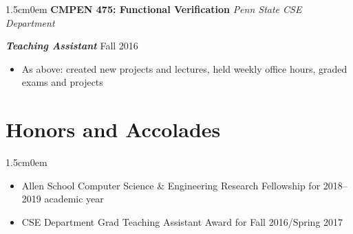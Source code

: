 \documentclass[letterpaper]{article}
\newcommand{\primaryindent}{1.5cm} %
\newenvironment{indented}{\begin{adjustwidth}{\primaryindent}{0em}}{\end{adjustwidth}}
\newenvironment{resumelist}{\begin{itemize}[topsep=0pt,noitemsep,itemindent=-15pt,leftmargin=30pt]}{\end{itemize}}
\newcommand{\generalentry}[5]{
	\begin{indented}
		\Large \textsf{\textbf{#1}} \hfill	%
			\hfill\normalsize\textit{#2} \par  			%
		\noindent \large \textsf{\textbf{\textit{#3}}} 	%
			\hfill \normalsize #4\par 					%
		\normalsize \normalfont #5 \par					%
		\normalsize \normalfont
	\end{indented}
	}
\begin{document}
\vspace{3mm}

\generalentry{CMPEN 475: Functional Verification}{Penn State CSE Department}{Teaching Assistant}{Fall 2016}{
	\begin{resumelist}
		\item As above: created new projects and lectures, held weekly office hours, graded exams and projects
	\end{resumelist}
}

\section*{Honors and Accolades}
\begin{indented}
	\begin{resumelist}
  \item Allen School Computer Science \& Engineering Research Fellowship for 2018--2019 academic year
	\item CSE Department Grad Teaching Assistant Award for Fall 2016/Spring 2017
	\end{resumelist}
\end{indented}

\nocite{*}

\renewcommand{\refname}{Publications}

\end{document}
